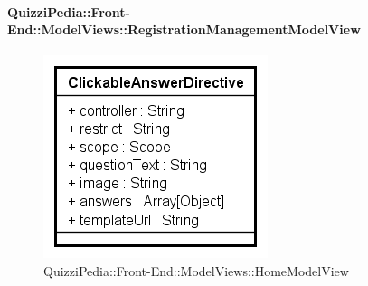 \paragraph{QuizziPedia::Front-End::ModelViews::RegistrationManagementModelView}
	
	\label{QuizziPedia::Front-End::ModelViews::RegistrationManagementModelView}
	
	\begin{figure}[ht]
		\centering
		\includegraphics[scale=0.5,keepaspectratio]{UML/Classi/Front-End/QuizziPedia_Front-end_Templates_ClickableAnswerTemplate.png}
		\caption{QuizziPedia::Front-End::ModelViews::HomeModelView}
	\end{figure} \FloatBarrier
	
